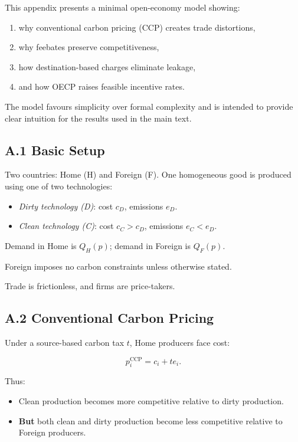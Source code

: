 \documentclass[12pt]{article}
\begin{document}
This appendix presents a minimal open-economy model showing:

\begin{enumerate}
    \item why conventional carbon pricing (CCP) creates trade distortions,
    \item why feebates preserve competitiveness,
    \item how destination-based charges eliminate leakage,
    \item and how OECP raises feasible incentive rates.
\end{enumerate}

The model favours simplicity over formal complexity and is intended to 
provide clear intuition for the results used in the main text.

\subsection{A.1 Basic Setup}

Two countries: Home (H) and Foreign (F).  
One homogeneous good is produced using one of two technologies:

\begin{itemize}
    \item \emph{Dirty technology (D)}: cost $c_D$, emissions $e_D$.
    \item \emph{Clean technology (C)}: cost $c_C > c_D$, emissions $e_C < e_D$.
\end{itemize}

Demand in Home is $Q_H(p)$; demand in Foreign is $Q_F(p)$.

Foreign imposes no carbon constraints unless otherwise stated.

Trade is frictionless, and firms are price-takers.

\subsection{A.2 Conventional Carbon Pricing}

Under a source-based carbon tax $t$, Home producers face cost:

\[
p_i^{\text{CCP}} = c_i + t e_i.
\]

Thus:

\begin{itemize}
    \item Clean production becomes more competitive relative to dirty production.
    \item \textbf{But} both clean and dirty production become less competitive 
          relative to Foreign producers.
\end{itemize}
\end{document}
